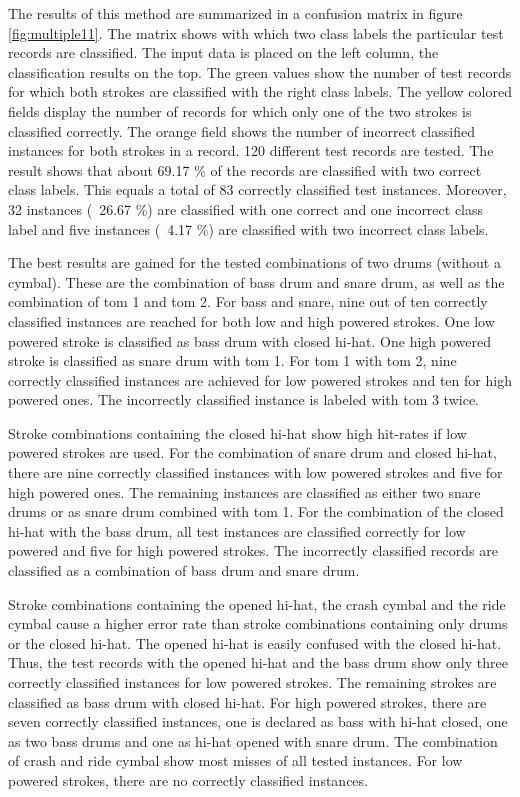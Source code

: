 The results of this method are summarized in a confusion matrix in figure \ref{fig:multiple11}. The matrix shows with which two class labels the particular test records are classified. The input data is placed on the left column, the classification results on the top. The green values show the number of test records for which both strokes are classified with the right class labels. The yellow colored fields display the number of records for which only one of the two strokes is classified correctly. The orange field shows the number of incorrect classified instances for both strokes in a record. 120 different test records are tested. The result shows that about 69.17 \% of the records are classified with two correct class labels. This equals a total of 83 correctly classified test instances. Moreover, 32 instances (~26.67 \%) are classified with one correct and one incorrect class label and five instances (~4.17 \%) are classified with two incorrect class labels.

The best results are gained for the tested combinations of two drums (without a cymbal). These are the combination of bass drum and snare drum, as well as the combination of tom 1 and tom 2. For bass and snare, nine out of ten correctly classified instances are reached for both low and  high powered strokes. One low powered stroke is classified as bass drum with closed hi-hat. One high powered stroke is classified as snare drum with tom 1. For tom 1 with tom 2, nine correctly classified instances are achieved for low powered strokes and ten for high powered ones. The incorrectly classified instance is labeled with tom 3 twice.

Stroke combinations containing the closed hi-hat show high hit-rates if low powered strokes are used. For the combination of snare drum and closed hi-hat, there are nine correctly classified instances with low powered strokes and five for high powered ones. The remaining instances are classified as either two snare drums or as snare drum combined with tom 1. For the combination of the closed hi-hat with the bass drum, all test instances are classified correctly for low powered and five for high powered strokes. The incorrectly classified records are classified as a combination of bass drum and snare drum.

Stroke combinations containing the opened hi-hat, the crash cymbal and the ride cymbal cause a higher error rate than stroke combinations containing only drums or the closed hi-hat. The opened hi-hat is easily confused with the closed hi-hat. Thus, the test records with the opened hi-hat and the bass drum show only three correctly classified instances for low powered strokes. The remaining strokes are classified as bass drum with closed hi-hat. For high powered strokes, there are seven correctly classified instances, one is declared as bass with hi-hat closed, one as two bass drums and one as hi-hat opened with snare drum. The combination of crash and ride cymbal show most misses of all tested instances. For low powered strokes, there are no correctly classified instances.

